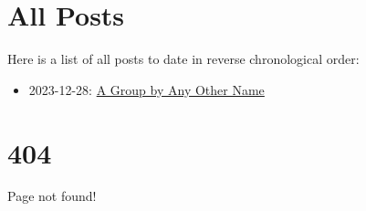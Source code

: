 \documentclass{article}
\begin{document}
\part*{\centering All Posts}

\newline

Here is a list of all posts to date in reverse chronological order:

\begin{itemize}
\item 2023-12-28: \href{posts/other_name.html}{A Group by Any Other Name}
\end{itemize}

\part*{404}

\newline

Page not found!
\end{document}
